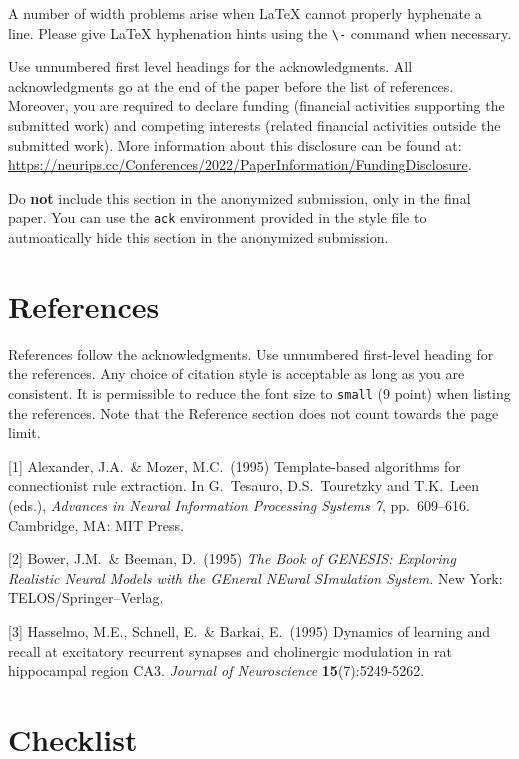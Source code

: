 \documentclass{article}
\begin{document}
A number of width problems arise when \LaTeX{} cannot properly hyphenate a
line. Please give LaTeX hyphenation hints using the \verb+\-+ command when
necessary.


\begin{ack}
Use unnumbered first level headings for the acknowledgments. All acknowledgments
go at the end of the paper before the list of references. Moreover, you are required to declare
funding (financial activities supporting the submitted work) and competing interests (related financial activities outside the submitted work).
More information about this disclosure can be found at: \url{https://neurips.cc/Conferences/2022/PaperInformation/FundingDisclosure}.


Do {\bf not} include this section in the anonymized submission, only in the final paper. You can use the \texttt{ack} environment provided in the style file to autmoatically hide this section in the anonymized submission.
\end{ack}

\section*{References}


References follow the acknowledgments. Use unnumbered first-level heading for
the references. Any choice of citation style is acceptable as long as you are
consistent. It is permissible to reduce the font size to \verb+small+ (9 point)
when listing the references.
Note that the Reference section does not count towards the page limit.
\medskip


{
\small


[1] Alexander, J.A.\ \& Mozer, M.C.\ (1995) Template-based algorithms for
connectionist rule extraction. In G.\ Tesauro, D.S.\ Touretzky and T.K.\ Leen
(eds.), {\it Advances in Neural Information Processing Systems 7},
pp.\ 609--616. Cambridge, MA: MIT Press.


[2] Bower, J.M.\ \& Beeman, D.\ (1995) {\it The Book of GENESIS: Exploring
  Realistic Neural Models with the GEneral NEural SImulation System.}  New York:
TELOS/Springer--Verlag.


[3] Hasselmo, M.E., Schnell, E.\ \& Barkai, E.\ (1995) Dynamics of learning and
recall at excitatory recurrent synapses and cholinergic modulation in rat
hippocampal region CA3. {\it Journal of Neuroscience} {\bf 15}(7):5249-5262.
}


\section*{Checklist}
\end{document}
